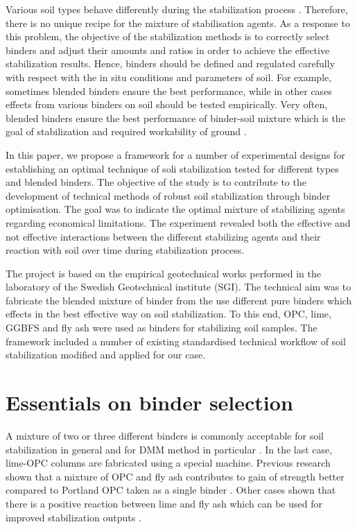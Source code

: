 \documentclass[eprint,
]{actapoly}
\begin{document}
Various soil types behave differently during the stabilization process \citep{BhattacharjaBhatty,Burroughs2008,Renjithetal2020,VENDAOLIVEIRA2018336,Wall}. Therefore, there is no unique recipe for the mixture of stabilisation agents. As a response to this problem, the objective of the stabilization methods is to correctly select binders and adjust their amounts and ratios in order to achieve the effective stabilization results. Hence, binders should be defined and regulated carefully with respect with the in situ conditions and parameters of soil. For example, sometimes blended binders ensure the best performance, while in other cases effects from various binders on  soil should be tested empirically. Very often, blended binders ensure the best performance of binder-soil mixture which is the goal of stabilization and required workability of ground \citep{Schanz,Kangetal2019}. 

In this paper, we propose a framework for a number of experimental designs for establishing an optimal technique of soli stabilization tested for different types and blended binders. The objective of the study is to contribute to the development of technical methods of robust soil stabilization through binder optimisation. The goal was to indicate the optimal mixture of stabilizing agents regarding economical limitations. The experiment revealed both the effective and not effective interactions between the different stabilizing agents and their reaction with soil over time during stabilization process. 

The project is based on the empirical geotechnical works performed in the laboratory of the Swedish Geotechnical institute (SGI). The technical aim was to fabricate the blended mixture of binder from the use different pure binders which effects in the best effective way on soil stabilization. To this end, OPC, lime, GGBFS and fly ash were used as binders for stabilizing soil samples. The framework included a number of existing standardised technical workflow of soil stabilization modified and applied for our case.

\section{Essentials on binder selection}
A mixture of two or three different binders is commonly acceptable for soil stabilization in general and for DMM method in particular \cite{BergmanLarsson,Naqshabandy,Paniagua}. In the last case, lime-OPC columns are fabricated using a special machine. Previous research shown that a mixture of OPC and fly ash contributes to gain of strength better compared to Portland OPC taken as a single binder \cite{Yaxuetal2022,Vukicevicetal}. Other cases shown that there is a positive reaction between lime and fly ash which can be used for improved stabilization outputs \cite{GoswamiSingh,Raoetal2008,Knapiketal2015}. 
\end{document}
